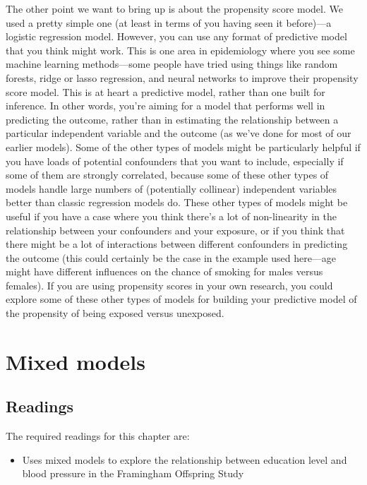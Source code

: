 \documentclass[
]{book}
\providecommand{\tightlist}{%
  \setlength{\itemsep}{0pt}\setlength{\parskip}{0pt}}
\begin{document}
The other point we want to bring up is about the propensity score model. We used a pretty simple one (at least in terms of you having seen it before)---a logistic regression model. However, you can use any format of predictive model that you think might work. This is one area in epidemiology where you see some machine learning methods---some people have tried using things like random forests, ridge or lasso regression, and neural networks to improve their propensity score model. This is at heart a predictive model, rather than one built for inference. In other words, you're aiming for a model that performs well in predicting the outcome, rather than in estimating the relationship between a particular independent variable and the outcome (as we've done for most of our earlier models). Some of the other types of models might be particularly helpful if you have loads of potential confounders that you want to include, especially if some of them are strongly correlated, because some of these other types of models handle large numbers of (potentially collinear) independent variables better than classic regression models do. These other types of models might be useful if you have a case where you think there's a lot of non-linearity in the relationship between your confounders and your exposure, or if you think that there might be a lot of interactions between different confounders in predicting the outcome (this could certainly be the case in the example used here---age might have different influences on the chance of smoking for males versus females). If you are using propensity scores in your own research, you could explore some of these other types of models for building your predictive model of the propensity of being exposed versus unexposed.

\hypertarget{mixed-models}{%
\chapter{Mixed models}\label{mixed-models}}

\hypertarget{readings-6}{%
\section{Readings}\label{readings-6}}

The required readings for this chapter are:

\begin{itemize}
\tightlist
\item
  \citet{loucks2011associations} Uses mixed models to explore the relationship between
  education level and blood pressure in the Framingham Offspring Study
\end{itemize}
\end{document}
